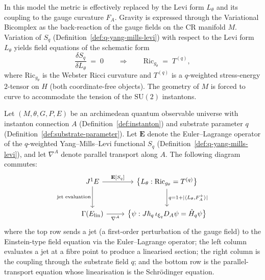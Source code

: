 \begin{example}
\begin{remark}
\label{rem:gr-substrate-geometry}
In this model the metric is effectively replaced by the Levi form
$L_\theta$ and its coupling to the gauge curvature $F_A$.  Gravity is
expressed through the Variational Bicomplex as the back-reaction of the
gauge fields on the CR manifold $M$.
Variation of $S_q$ (Definition~\ref{def:q-yang-mills-levi}) with respect
to the Levi form $L_\theta$ yields field equations of the schematic form
\[
  \frac{\delta S_q}{\delta L_\theta}
  \;=\; 0
  \qquad\Longrightarrow\qquad
  \mathrm{Ric}_{g_\theta} \;=\; T^{(q)},
\]
where $\mathrm{Ric}_{g_\theta}$ is the Webster Ricci curvature and
$T^{(q)}$ is a $q$-weighted stress-energy $2$-tensor on $H$ (both
coordinate-free objects).  The geometry of $M$ is forced to curve to accommodate the tension of the
$\mathrm{SU}(2)$ instantons.
\end{remark}

\begin{proposition}
\label{prop:main-commutative-diagram}
\leanok
Let $(M, \theta, G, P, E)$ be an archimedean quantum observable universe
with instanton connection $A$ (Definition~\ref{def:instanton}) and substrate
parameter $q$ (Definition~\ref{def:substrate-parameter}).  Let
$\mathbf{E}$ denote the Euler--Lagrange operator of the
$q$-weighted Yang--Mills--Levi functional $S_q$
(Definition~\ref{def:q-yang-mills-levi}), and let $\nabla^A$ denote
parallel transport along $A$.  The following diagram commutes:
\[
\begin{tikzcd}[row sep=2.5em, column sep=2.5em]
  J^1E
    \ar[r, "{\mathbf{E}[S_q]}"]
    \ar[d, "\text{jet evaluation}"']
  & \bigl\{ L_\theta : \mathrm{Ric}_{g_\theta} = T^{(q)} \bigr\}
    \ar[d, "{q = 1 + \lvert\langle L_\theta, F_A^+\rangle\rvert}"]
  \\
  \Gamma(E_{\mathrm{lin}})
    \ar[r, "\nabla^A"']
  & \bigl\{ \psi : J\hbar_q\,\iota_{\xi_q}D_A\psi = \hat{H}_q\psi \bigr\}
\end{tikzcd}
\]
where the top row sends a jet (a first-order perturbation of the gauge field)
to the Einstein-type field equation via the Euler--Lagrange operator; the
left column evaluates a jet at a fibre point to produce a linearised section;
the right column is the coupling through the substrate field $q$; and the
bottom row is the parallel-transport equation whose linearisation is the
Schr\"odinger equation.
\end{proposition}


\end{example}
